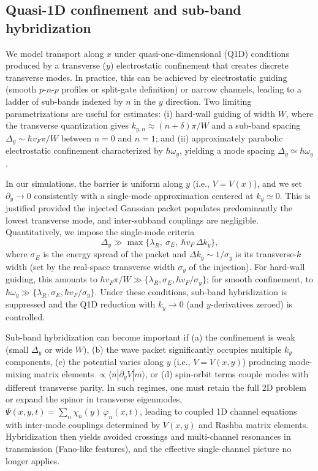 \subsection{Quasi-1D confinement and sub-band hybridization}\label{subsec:q1d-confinement-hybridization}
We model transport along $x$ under quasi-one-dimensional (Q1D) conditions produced by a transverse ($y$) electrostatic confinement that creates discrete transverse modes.
In practice, this can be achieved by electrostatic guiding (smooth $p$-$n$-$p$ profiles or split-gate definition) or narrow channels, leading to a ladder of sub-bands indexed by $n$ in the $y$ direction\cite{Young2009, ParedesPhysRevB2021, TrauzettelNature2007}.
Two limiting parametrizations are useful for estimates:
(i) hard-wall guiding of width $W$, where the transverse quantization gives $k_{y,n}\approx (n+\delta)\pi/W$ and a sub-band spacing $\Delta_y\sim \hbar v_F\pi/W$ between $n=0$ and $n=1$; and
(ii) approximately parabolic electrostatic confinement characterized by $\hbar\omega_y$, yielding a mode spacing $\Delta_y\simeq \hbar\omega_y$.

In our simulations, the barrier is uniform along $y$ (i.e., $V=V(x)$), and we set $\partial_y\to 0$ consistently with a single-mode approximation centered at $k_y\simeq 0$.
This is justified provided the injected Gaussian packet populates predominantly the lowest transverse mode, and inter-subband couplings are negligible.
Quantitatively, we impose the single-mode criteria
\begin{equation*}
\Delta_y \gg \max\{\lambda_R,\ \sigma_E,\ \hbar v_F\,\Delta k_y\},
\end{equation*}
\noindent where $\sigma_E$ is the energy spread of the packet and $\Delta k_y\sim 1/\sigma_y$ is its transverse-$k$ width (set by the real-space transverse width $\sigma_y$ of the injection).
For hard-wall guiding, this amounts to $\hbar v_F\pi/W \gg \{\lambda_R,\sigma_E,\hbar v_F/\sigma_y\}$; for smooth confinement, to $\hbar\omega_y \gg \{\lambda_R,\sigma_E,\hbar v_F/\sigma_y\}$.
Under these conditions, sub-band hybridization is suppressed and the Q1D reduction with $k_y\to 0$ (and $y$-derivatives zeroed) is controlled.

Sub-band hybridization can become important if (a) the confinement is weak (small $\Delta_y$ or wide $W$), (b) the wave packet significantly occupies multiple $k_y$ components, (c) the potential varies along $y$ (i.e., $V=V(x,y)$) producing mode-mixing matrix elements $\propto\langle n|\partial_y V|m\rangle$, or (d) spin-orbit terms couple modes with different transverse parity.
In such regimes, one must retain the full 2D problem or expand the spinor in transverse eigenmodes,
$\Psi(x,y,t)=\sum_n \chi_n(y)\, \varphi_n(x,t)$,
leading to coupled 1D channel equations with inter-mode couplings determined by $V(x,y)$ and Rashba matrix elements.
Hybridization then yields avoided crossings and multi-channel resonances in transmission (Fano-like features), and the effective single-channel picture no longer applies\cite{MiroshnichenkoRevModPhys2010}.

